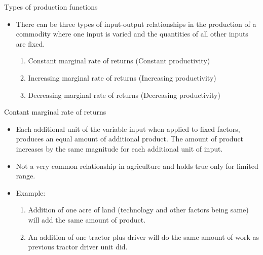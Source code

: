\documentclass[12pt,ignorenonframetext,aspectratio=169]{beamer}
\providecommand{\tightlist}{%
  \setlength{\itemsep}{0pt}\setlength{\parskip}{0pt}}
\begin{document}
\begin{frame}{Types of production functions}
\protect\hypertarget{types-of-production-functions}{}
\begin{itemize}
\tightlist
\item
  There can be three types of input-output relationships in the
  production of a commodity where one input is varied and the quantities
  of all other inputs are fixed.

  \begin{enumerate}
  \tightlist
  \item
    Constant marginal rate of returns (Constant productivity)
  \item
    Increasing marginal rate of returns (Increasing productivity)
  \item
    Decreasing marginal rate of returns (Decreasing productivity)
  \end{enumerate}
\end{itemize}
\end{frame}

\begin{frame}{Contant marginal rate of returns}
\protect\hypertarget{contant-marginal-rate-of-returns}{}
\begin{itemize}
\tightlist
\item
  Each additional unit of the variable input when applied to fixed
  factors, produces an equal amount of additional product. The amount of
  product increases by the same magnitude for each additional unit of
  input.
\item
  Not a very common relationship in agriculture and holds true only for
  limited range.
\item
  Example:

  \begin{enumerate}
  \tightlist
  \item
    Addition of one acre of land (technology and other factors being
    same) will add the same amount of product.
  \item
    An addition of one tractor plus driver will do the same amount of
    work as previous tractor driver unit did.
  \end{enumerate}
\end{itemize}
\end{frame}
\end{document}
